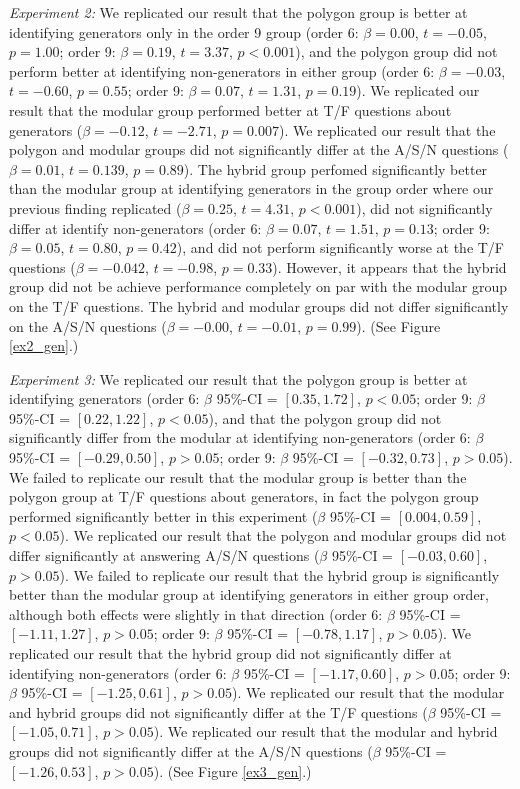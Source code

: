 \documentclass[man,10pt]{apa6}
\begin{document}
\textit{Experiment 2:} We replicated our result that the polygon group is better at identifying generators only in the order 9 group (order 6: $\beta = 0.00$, $t = -0.05$, $p = 1.00$; order 9: $\beta = 0.19$, $t = 3.37$, $p < 0.001$), and the polygon group did not perform better at identifying non-generators in either group (order 6: $\beta = -0.03$, $t = -0.60$, $p = 0.55$; order 9: $\beta = 0.07$, $t = 1.31$, $p = 0.19$). We replicated our result that the modular group performed better at T/F questions about generators ($\beta = -0.12$, $t = -2.71$, $p = 0.007$). We replicated our result that the polygon and modular groups did not significantly differ at the A/S/N questions ($\beta =  0.01$, $t = 0.139$, $p = 0.89$). The hybrid group perfomed significantly better than the modular group at identifying generators in the group order where our previous finding replicated ($\beta = 0.25$, $t = 4.31$, $p < 0.001$), did not significantly differ at identify non-generators (order 6: $\beta = 0.07$, $t = 1.51$, $p = 0.13$; order 9: $\beta = 0.05$, $t = 0.80$, $p = 0.42$), and did not perform significantly worse at the T/F questions ($\beta = -0.042$, $t = -0.98$, $p = 0.33$). However, it appears that the hybrid group did not be achieve performance completely on par with the modular group on the T/F questions. The hybrid and modular groups did not differ significantly on the A/S/N questions ($\beta = -0.00$, $t = -0.01$, $p = 0.99$). (See Figure \ref{ex2_gen}.) \par
\textit{Experiment 3:} We replicated our result that the polygon group is better at identifying generators (order 6: $\beta$ 95\%-CI = $[0.35,1.72]$, $p < 0.05$; order 9: $\beta$ 95\%-CI = $[0.22,1.22]$, $p < 0.05$), and that the polygon group did not significantly differ from the modular at identifying non-generators (order 6: $\beta$ 95\%-CI = $[-0.29,0.50]$, $p > 0.05$; order 9: $\beta$ 95\%-CI = $[-0.32,0.73]$, $p > 0.05$). We failed to replicate our result that the modular group is better than the polygon group at T/F questions about generators, in fact the polygon group performed significantly better in this experiment ($\beta$ 95\%-CI = $[0.004,0.59]$, $p < 0.05$). We replicated our result that the polygon and modular groups did not differ significantly at answering A/S/N questions ($\beta$ 95\%-CI = $[-0.03,0.60]$, $p > 0.05$). We failed to replicate our result that the hybrid group is significantly better than the modular group at identifying generators in either group order, although both effects were slightly in that direction (order 6: $\beta$ 95\%-CI = $[-1.11,1.27]$, $p > 0.05$; order 9: $\beta$ 95\%-CI = $[-0.78, 1.17]$, $p > 0.05$). We replicated our result that the hybrid group did not significantly differ at identifying non-generators (order 6: $\beta$ 95\%-CI = $[-1.17,0.60]$, $p > 0.05$; order 9: $\beta$ 95\%-CI = $[-1.25,0.61]$, $p > 0.05$). We replicated our result that the modular and hybrid groups did not significantly differ at the T/F questions ($\beta$ 95\%-CI = $[-1.05, 0.71]$, $p > 0.05$). We replicated our result that the modular and hybrid groups did not significantly differ at the A/S/N questions ($\beta$ 95\%-CI = $[-1.26,0.53]$, $p > 0.05$). (See Figure \ref{ex3_gen}.) \par
\end{document}
